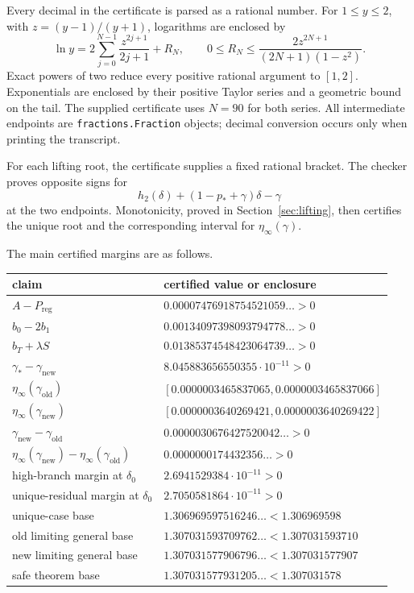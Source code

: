 \documentclass[11pt]{article}
\newcommand{\Preg}{P_{\mathrm{reg}}}
\newcommand{\hbin}{h_2}
\begin{document}
Every decimal in the certificate is parsed as a rational number.  For $1\le y\le2$, with $z=(y-1)/(y+1)$, logarithms are enclosed by
\[
 \ln y
 =2\sum_{j=0}^{N-1}\frac{z^{2j+1}}{2j+1}+R_N,
 \qquad
 0\le R_N\le
 \frac{2z^{2N+1}}{(2N+1)(1-z^2)}.
\]
Exact powers of two reduce every positive rational argument to $[1,2]$.  Exponentials are enclosed by their positive Taylor series and a geometric bound on the tail.  The supplied certificate uses $N=90$ for both series.  All intermediate endpoints are \texttt{fractions.Fraction} objects; decimal conversion occurs only when printing the transcript.

For each lifting root, the certificate supplies a fixed rational bracket.  The checker proves opposite signs for
\[
 \hbin(\delta)+(1-p_*+\gamma)\delta-\gamma
\]
at the two endpoints.  Monotonicity, proved in Section~\ref{sec:lifting}, then certifies the unique root and the corresponding interval for $\eta_\infty(\gamma)$.

The main certified margins are as follows.
\begin{center}
\small
\renewcommand{\arraystretch}{1.13}
\begin{tabular}{@{}ll@{}}
\toprule
claim & certified value or enclosure\\
\midrule
$A-\Preg$ & $0.00007476918754521059\ldots>0$\\
$b_0-2b_1$ & $0.00134097398093794778\ldots>0$\\
$b_T+\lambda S$ & $0.01385374548423064739\ldots>0$\\
$\gamma_*-\gamma_{\mathrm{new}}$ & $8.045883656550355\cdot10^{-11}>0$\\
$\eta_\infty(\gamma_{\mathrm{old}})$ & $[0.0000003465837065,0.0000003465837066]$\\
$\eta_\infty(\gamma_{\mathrm{new}})$ & $[0.0000003640269421,0.0000003640269422]$\\
$\gamma_{\mathrm{new}}-\gamma_{\mathrm{old}}$ & $0.0000030676427520042\ldots>0$\\
$\eta_\infty(\gamma_{\mathrm{new}})-\eta_\infty(\gamma_{\mathrm{old}})$ & $0.0000000174432356\ldots>0$\\
high-branch margin at $\delta_0$ & $2.6941529384\cdot10^{-11}>0$\\
unique-residual margin at $\delta_0$ & $2.7050581864\cdot10^{-11}>0$\\
unique-case base & $1.306969597516246\ldots<1.306969598$\\
old limiting general base & $1.307031593709762\ldots<1.307031593710$\\
new limiting general base & $1.307031577906796\ldots<1.307031577907$\\
safe theorem base & $1.307031577931205\ldots<1.307031578$\\
\bottomrule
\end{tabular}
\end{center}
\end{document}
